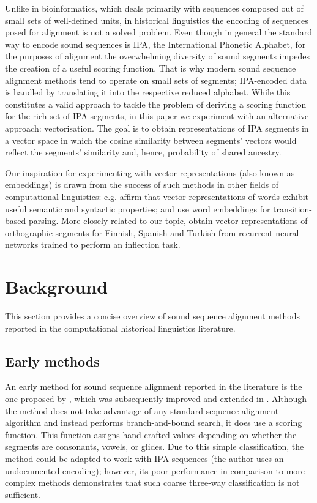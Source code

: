 \documentclass[a4paper]{report}
\begin{document}
Unlike in bioinformatics, which deals primarily with sequences composed out of small sets of well-defined units,
in historical linguistics the encoding of sequences posed for alignment is not a solved problem.
Even though in general the standard way to encode sound sequences is IPA, the International Phonetic Alphabet,
for the purposes of alignment the overwhelming diversity of sound segments impedes the creation of a useful scoring function.
That is why modern sound sequence alignment methods tend to operate on small sets of segments;
IPA-encoded data is handled by translating it into the respective reduced alphabet.
While this constitutes a valid approach to tackle the problem of deriving a scoring function for the rich set of IPA segments,
in this paper we experiment with an alternative approach: vectorisation.
The goal is to obtain representations of IPA segments in a vector space
in which the cosine similarity between segments' vectors would reflect the segments' similarity and, hence, probability of shared ancestry.

Our inspiration for experimenting with vector representations (also known as embeddings)
is drawn from the success of such methods in other fields of computational linguistics:
e.g. \citet{2013_Mikolov_al} affirm that vector representations of words exhibit useful semantic and syntactic properties;
and \citet{2014_Chen_Manning} use word embeddings for transition-based parsing.
More closely related to our topic,
\citet{2018_Silfverberg_al} obtain vector representations of orthographic segments for Finnish, Spanish and Turkish
from recurrent neural networks trained to perform an inflection task.


\section{Background}

This section provides a concise overview of sound sequence alignment methods reported in the computational historical linguistics literature.


\subsection{Early methods}

An early method for sound sequence alignment reported in the literature is the one proposed by \citet{1996_Covington},
which was subsequently improved and extended in \citet{1998_Covington}.
Although the method does not take advantage of any standard sequence alignment algorithm and instead performs branch-and-bound search,
it does use a scoring function.
This function assigns hand-crafted values depending on whether the segments are consonants, vowels, or glides.
Due to this simple classification, the method could be adapted to work with IPA sequences (the author uses an undocumented encoding);
however, its poor performance in comparison to more complex methods demonstrates that such coarse three-way classification is not sufficient.
\end{document}

